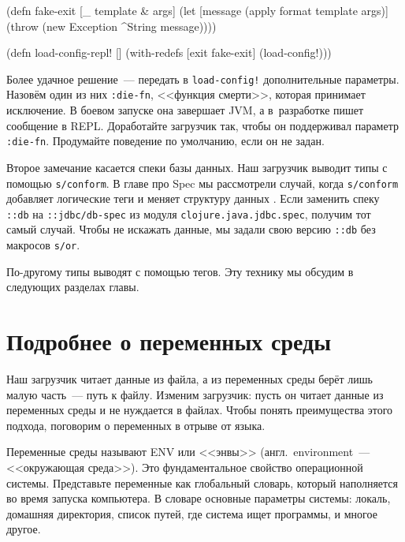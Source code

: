 \else

\begin{english}
  \begin{clojure}
(defn fake-exit
  [_ template & args]
  (let [message (apply format template args)]
    (throw (new Exception ^String message))))

(defn load-config-repl! []
  (with-redefs [exit fake-exit]
    (load-config!)))
  \end{clojure}
\end{english}

\fi


Более удачное решение~--- передать в \texttt{load-con\-fig!} дополнительные
параметры. Назовём один из них \verb|:die-fn|, <<функция смерти>>, которая
принимает исключение. В боевом запуске она завершает JVM, а в~разработке пишет
сообщение в REPL. Доработайте загрузчик так, чтобы он поддерживал параметр
\verb|:die-fn|. Продумайте поведение по умолчанию, если он не задан.

Второе замечание касается спеки базы данных. Наш загрузчик выводит типы с
помощью \verb|s/conform|. В главе про Spec мы рассмотрели случай, когда
\verb|s/conform| добавляет логические теги и меняет структуру
данных . Если заменить спеку \verb|::db| на
\verb|::jdbc/db-spec| из модуля \texttt{clojure.java.jdbc.spec}, получим тот
самый случай. Чтобы не искажать данные, мы задали свою версию \verb|::db| без
макросов \verb|s/or|.


По-другому типы выводят с помощью тегов. Эту технику мы обсудим в следующих
разделах главы.

\section{Подробнее о переменных среды}


Наш загрузчик читает данные из файла, а из переменных среды берёт лишь малую
часть~--- путь к файлу. Изменим загрузчик: пусть он читает данные из переменных
среды и не нуждается в файлах. Чтобы понять преимущества этого подхода,
поговорим о переменных в отрыве от языка.

Переменные среды называют ENV или <<энвы>> (англ.~envi\-ron\-ment~--- <<окружающая
среда>>). Это фундаментальное свойство операционной системы. Представьте
переменные как глобальный словарь, который наполняется во время запуска
компьютера. В словаре основные параметры системы: локаль, домашняя директория,
список путей, где система ищет программы, и многое другое.

